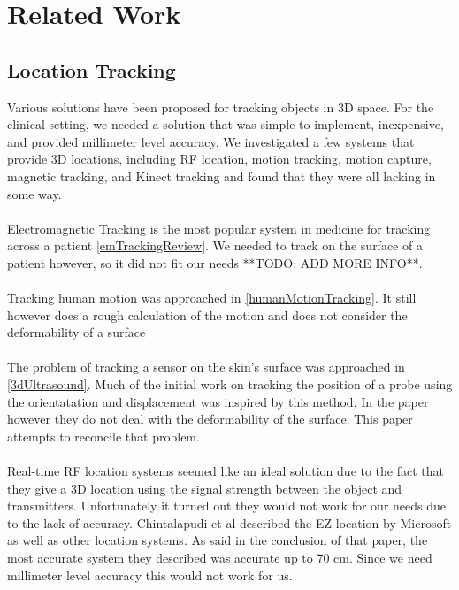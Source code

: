 \section{Related Work}

\subsection{Location Tracking}

Various solutions have been proposed for tracking objects in 3D space. For the clinical setting, we needed a solution that was simple to implement, inexpensive, and provided millimeter level accuracy. We investigated a few systems that provide 3D locations, including RF location, motion tracking, motion capture, magnetic tracking, and Kinect tracking and found that they were all lacking in some way. \\
\\
Electromagnetic Tracking is the most popular system in medicine for tracking across a patient \ref{emTrackingReview}. We needed to track on the surface of a patient however, so it did not fit our needs **TODO: ADD MORE INFO**. \\
\\
Tracking human motion was approached in \ref{humanMotionTracking}. It still however does a rough calculation of the motion and does not consider the deformability of a surface\\
\\
The problem of tracking a sensor on the skin's surface was approached in \ref{3dUltrasound}. Much of the initial work on tracking the position of a probe using the orientatation and displacement was inspired by this method. In the paper however they do not deal with the deformability of the surface. This paper attempts to reconcile that problem. \\
\\
Real-time RF location systems seemed like an ideal solution due to the fact that they give a 3D location using the signal strength between the object and transmitters. Unfortunately it turned out they would not work for our needs due to the lack of accuracy. Chintalapudi et al \cite{ezlocation} described the EZ location by Microsoft as well as other location systems. As said in the conclusion of that paper, the most accurate system they described was accurate up to 70 cm. Since we need millimeter level accuracy this would not work for us. \\
\\
